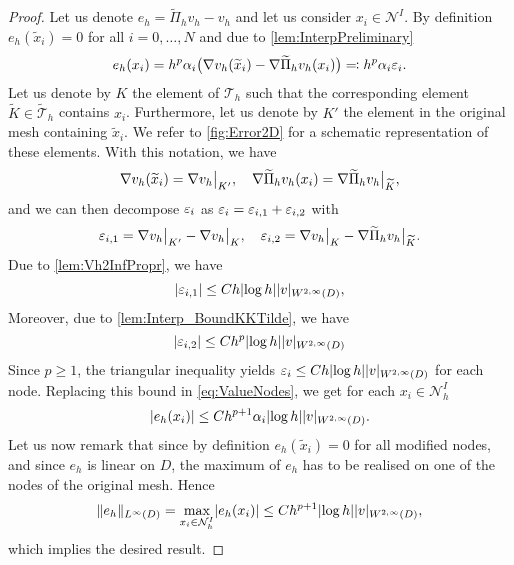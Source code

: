 \begin{proof} Let us denote $e_h = \widetilde \Pi_h v_h - v_h$ and let us consider $x_i \in \mathcal N^I$. By definition $e_h(\tilde x_i) = 0$ for all $i = 0, \ldots, N$ and due to \cref{lem:InterpPreliminary}
	\begin{equation}\label{eq:ValueNodes}
		e_h(x_i) = h^p \alpha_i \big(\nabla v_h(\widetilde x_i) - \nabla \widetilde \Pi_hv_h(x_i)\big)  \eqqcolon h^p \alpha_i\varepsilon_i.
	\end{equation}
	Let us denote by $K$ the element of $\mathcal T_h$ such that the corresponding element $\widetilde K \in \widetilde{\mathcal T}_h$ contains $x_i$. Furthermore, let us denote by $K'$ the element in the original mesh containing $\tilde x_i$. We refer to \cref{fig:Error2D} for a schematic representation of these elements. With this notation, we have 
	\begin{equation}
		\nabla v_h(\widetilde x_i) = \nabla v_h\bigr\rvert_{K'}, \quad \nabla \widetilde \Pi_hv_h(x_i) = \nabla \widetilde \Pi_h v_h\bigr\rvert_{\widetilde K},
	\end{equation}
	and we can then decompose $\varepsilon_i$ as $\varepsilon_i = \varepsilon_{i,1} + \varepsilon_{i, 2}$ with
	\begin{equation}
		\varepsilon_{i, 1} = \nabla v_h\bigr\rvert_{K'} - \nabla v_h\bigr\rvert_{K}, \quad  \varepsilon_{i, 2} = \nabla v_h\bigr\rvert_{K}  - \nabla \widetilde \Pi_h v_h \bigr\rvert_{\widetilde K}.
	\end{equation}
	Due to \cref{lem:Vh2InfPropr}, we have 
	\begin{equation}\label{eq:boundEps1Proof2d}
	\lvert\varepsilon_{i, 1}\rvert \leq C h \lvert\log h\rvert \lvert v\rvert_{W^{2, \infty}(D)},
	\end{equation}
	Moreover, due to \cref{lem:Interp_BoundKKTilde}, we have
	\begin{equation}
		\lvert\varepsilon_{i, 2}\rvert \leq C h^p \lvert\log h\rvert \lvert v\rvert_{W^{2, \infty}(D)}
	\end{equation} 
	Since $p \geq 1$, the triangular inequality yields $\varepsilon_{i} \leq Ch \lvert\log h\rvert \lvert v\rvert_{W^{2, \infty}(D)}$ for each node. Replacing this bound in \eqref{eq:ValueNodes}, we get for each $x_i \in \mathcal N_h^I$
	\begin{equation}
		\lvert e_h(x_i)\rvert \leq C h^{p+1} \alpha_i \lvert\log h\rvert \lvert v\rvert_{W^{2, \infty}(D)}.
	\end{equation}
	Let us now remark that since by definition $e_h(\tilde x_i) = 0$ for all modified nodes, and since $e_h$ is linear on $D$, the maximum of $e_h$ has to be realised on one of the nodes of the original mesh. Hence
	\begin{equation}
		\lVert e_h\rVert_{L^{\infty}(D)} = \max_{x_i \in \mathcal N_h^{I}} \lvert e_h(x_i)\rvert \leq C h^{p+1} \lvert\log h\rvert \lvert v\rvert_{W^{2, \infty}(D)},
	\end{equation}
	which implies the desired result.
\end{proof}

